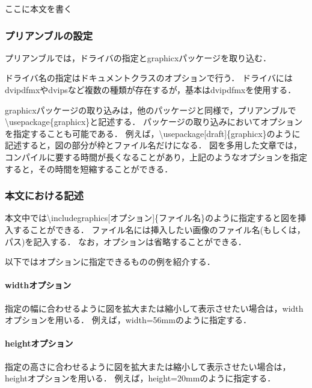   ここに本文を書く 
\\\noindent\hrulefill 

\subsubsection{プリアンブルの設定}

プリアンブルでは，ドライバの指定とgraphicxパッケージを取り込む．

ドライバ名の指定はドキュメントクラスのオプションで行う．
ドライバにはdvipdfmxやdvipsなど複数の種類が存在するが，基本はdvipdfmxを使用する．

graphicxパッケージの取り込みは，他のパッケージと同様で，プリアンブルで\textbackslash usepackage\{graphicx\}と記述する．
パッケージの取り込みにおいてオプションを指定することも可能である．
例えば，\textbackslash usepackage[draft]\{graphicx\}のように記述すると，図の部分が枠とファイル名だけになる．
図を多用した文章では，コンパイルに要する時間が長くなることがあり，上記のようなオプションを指定すると，その時間を短縮することができる．
  
\subsubsection{本文における記述}

本文中では\textbackslash includegraphics[オプション]\{ファイル名\}のように指定すると図を挿入することができる．
ファイル名には挿入したい画像のファイル名(もしくは，パス)を記入する．
なお，オプションは省略することができる．

以下ではオプションに指定できるものの例を紹介する．

\paragraph{widthオプション\\}

指定の幅に合わせるように図を拡大または縮小して表示させたい場合は，widthオプションを用いる．
例えば，width=56mmのように指定する．

\paragraph{heightオプション\\}

指定の高さに合わせるように図を拡大または縮小して表示させたい場合は，heightオプションを用いる．
例えば，height=20mmのように指定する．

